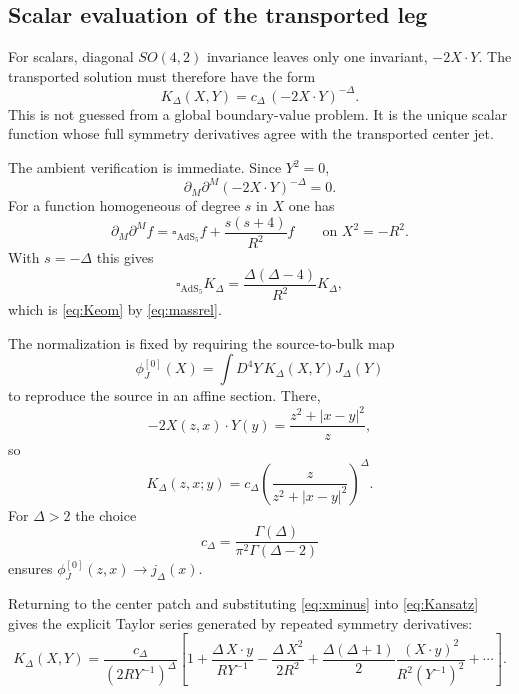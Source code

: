 \documentclass[11pt]{article}
\newcommand{\AdS}{\mathrm{AdS}_5}
\newcommand{\bdy}{\partial}
\renewcommand{\Box}{\square}
\begin{document}
\subsection{Scalar evaluation of the transported leg}

For scalars, diagonal $SO(4,2)$ invariance leaves only one invariant, $-2X\cdot Y$. The transported solution must therefore have the form
\begin{equation}
K_\Delta(X,Y)=c_\Delta\,(-2X\cdot Y)^{-\Delta}.
\label{eq:Kansatz}
\end{equation}
This is not guessed from a global boundary-value problem. It is the unique scalar function whose full symmetry derivatives agree with the transported center jet.

The ambient verification is immediate. Since $Y^2=0$,
\begin{equation}
\bdy_M\bdy^M(-2X\cdot Y)^{-\Delta}=0.
\end{equation}
For a function homogeneous of degree $s$ in $X$ one has
\begin{equation}
\bdy_M\bdy^M f
=
\Box_{\AdS}f+\frac{s(s+4)}{R^2}f
\qquad\text{on }X^2=-R^2.
\end{equation}
With $s=-\Delta$ this gives
\begin{equation}
\Box_{\AdS}K_\Delta
=
\frac{\Delta(\Delta-4)}{R^2}K_\Delta,
\end{equation}
which is \cref{eq:Keom} by \cref{eq:massrel}.

The normalization is fixed by requiring the source-to-bulk map
\begin{equation}
\phi_J^{[0]}(X)=\int D^4Y\,K_\Delta(X,Y)J_\Delta(Y)
\label{eq:phi0J}
\end{equation}
to reproduce the source in an affine section. There,
\begin{equation}
-2X(z,x)\cdot Y(y)=\frac{z^2+|x-y|^2}{z},
\end{equation}
so
\begin{equation}
K_\Delta(z,x;y)=c_\Delta\left(\frac{z}{z^2+|x-y|^2}\right)^\Delta.
\label{eq:Kpoincare}
\end{equation}
For $\Delta>2$ the choice
\begin{equation}
c_\Delta=\frac{\Gamma(\Delta)}{\pi^2\Gamma(\Delta-2)}
\label{eq:cDelta}
\end{equation}
ensures $\phi_J^{[0]}(z,x)\to j_\Delta(x)$.

Returning to the center patch and substituting \cref{eq:xminus} into \cref{eq:Kansatz} gives the explicit Taylor series generated by repeated symmetry derivatives:
\begin{equation}
K_\Delta(X,Y)
=
\frac{c_\Delta}{(2RY^{-1})^\Delta}
\left[
1+\frac{\Delta\,X\cdot y}{RY^{-1}}
-\frac{\Delta\,X^2}{2R^2}
+\frac{\Delta(\Delta+1)}{2}\frac{(X\cdot y)^2}{R^2(Y^{-1})^2}
+\cdots
\right].
\label{eq:Kpatch}
\end{equation}
\end{document}
